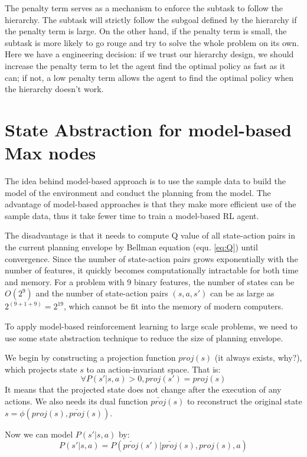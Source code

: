 \documentclass{article} %
\begin{document}
The penalty term serves as a mechanism to enforce the subtask to follow the hierarchy.
The subtask will strictly follow the subgoal defined by the hierarchy if the penalty term is large.
On the other hand, if the penalty term is small, the subtask is more likely to go rouge and try to 
solve the whole problem on its own. Here we have a engineering decision: if we trust our hierarchy design, 
we should increase the penalty term to let the agent find the optimal policy as fast as it can; 
if not, a low penalty term allows the agent to find the optimal policy when the hierarchy doesn't work.


\section{State Abstraction for model-based Max nodes}
\label{se:Model}
The idea behind model-based approach is to use the sample data to build the model of the environment
and conduct the planning from the model.
The advantage of model-based approaches is that they make more efficient use of the sample data, thus 
it take fewer time to train a model-based RL agent.

The disadvantage is that it needs to compute Q value of all state-action pairs in the current 
planning envelope by Bellman equation (equ. \ref{eq:Q}) until convergence.
Since the number of state-action pairs grows exponentially with the number of features,
it quickly becomes computationally intractable for both time and memory.
For a problem with 9 binary features, the number of states can be $O(2^9)$ and the
number of state-action pairs $(s, a, s')$ can be as large as $2^(9+1+9)=2^19$, which cannot be fit into the
memory of modern computers.

To apply model-based reinforcement learning to large scale problems, 
we need to use some state abstraction technique to reduce the size of planning envelope.

We begin by constructing a projection function $proj(s)$ (it always exists, why?),
which projects state $s$ to an action-invariant space.
That is:
\begin{equation}
    \forall P(s'|s, a) > 0, proj(s') = proj(s)
\end{equation}
It means that the projected state does not change after the execution of 
any actions.
We also needs its dual function $\bar{proj}(s)$ to reconstruct 
the original state $s = \phi(proj(s), \bar{proj}(s))$.

Now we can model $P(s'|s, a)$ by:
\begin{equation}
    P(s'|s, a) = P(\bar{proj}(s')| \bar{proj}(s), proj(s), a)
\end{equation}
\end{document}
